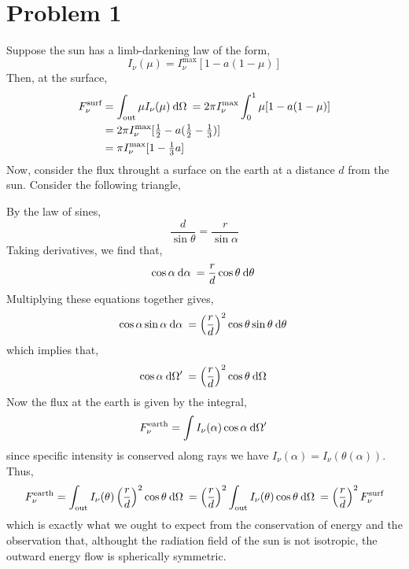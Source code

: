 \documentclass[12pt]{article}
\begin{document}

\newcommand{\Inumax}{I_\nu^{\text{max}}}
\usetikzlibrary{quotes,angles}


\section*{Problem 1}
Suppose the sun has a limb-darkening law of the form,
\[ I_\nu(\mu) = \Inumax [1 - a(1 - \mu)] \]
Then, at the surface,
\begin{align*}
F_\nu^{\text{surf}} & = \int_{\text{out}}  \mu I_\nu(\mu) \d{\Omega} = 2 \pi \Inumax \int_0^{1} \mu [1 - a(1 - \mu)] 
 \\
 & = 2 \pi \Inumax  [ \tfrac{1}{2} - a ( \tfrac{1}{2} - \tfrac{1}{3})]
\\
& =  \pi \Inumax  [ 1 - \tfrac{1}{3}a ] 
\end{align*} 
Now, consider the flux throught a surface on the earth at a distance $d$ from the sun. Consider the following triangle,
\begin{center}
\end{center}
By the law of sines,
\[ \frac{d}{\sin{\theta}} = \frac{r}{\sin{\alpha}} \]
Taking derivatives, we find that,
\[ \cos{\alpha} \: \mathrm{d}\alpha \: = \frac{r}{d} \cos{\theta} \: \mathrm{d}\theta \: \]
Multiplying these equations together gives,
\[ \cos{\alpha} \sin{\alpha} \: \mathrm{d}\alpha \: = \left( \frac{r}{d} \right)^2 \cos{\theta} \sin{\theta} \: \mathrm{d}\theta \: \]
which implies that,
\[ \cos{\alpha} \: \mathrm{d}\Omega' \: = \left( \frac{r}{d} \right)^2 \cos{\theta} \: \mathrm{d}\Omega \: \]
Now the flux at the earth is given by the integral,
\[ F_\nu^{\text{earth}} = \int I_\nu(\alpha) \cos{\alpha} \: \mathrm{d}\Omega' \: \]
since specific intensity is conserved along rays we have $I_\nu(\alpha) = I_\nu(\theta(\alpha))$. Thus,
\[ F_\nu^{\text{earth}} = \int_{\text{out}} I_\nu(\theta) \left( \frac{r}{d} \right)^2 \cos{\theta} \: \mathrm{d}\Omega \: = \left( \frac{r}{d} \right)^2 \int_{\text{out}} I_\nu(\theta)  \cos{\theta} \: \mathrm{d}\Omega \: = \left( \frac{r}{d} \right)^2 F_\nu^{\text{surf}}  \]
which is exactly what we ought to expect from the conservation of energy and the observation that, althought the radiation field of the sun is not isotropic, the outward energy flow is spherically symmetric. 
\end{document}
